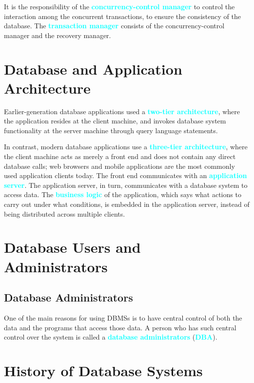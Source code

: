 \documentclass[a4paper,12pt,twoside,openany]{book}
\newcommand{\textcy}[1]{\textbf{\textcolor{cyan}{#1}}}
\begin{document}
It is the responsibility of the \textcy{concurrency-control manager} to control the interaction among the concurrent transactions, to ensure the consistency of the database. The \textcy{transaction manager} consists of the concurrency-control manager and the recovery manager.

\section{Database and Application Architecture}

Earlier-generation database applications used a \textcy{two-tier architecture}, where the application resides at the client machine, and invokes database system functionality at the server machine through query language statements.

In contrast, modern database applications use a \textcy{three-tier architecture}, where the client machine acts as merely a front end and does not contain any direct database calls; web browsers and mobile applications are the most commonly used application clients today. The front end communicates with an \textcy{application server}. The application server, in turn, communicates with a database system to access data. The \textcy{business logic} of the application, which says what actions to carry out under what conditions, is embedded in the application server, instead of being distributed across multiple clients.

\section{Database Users and Administrators}
\subsection{Database Administrators}

One of the main reasons for using DBMSs is to have central control of both the data and the programs that access those data. A person who has such central control over the system is called a \textcy{database administrators} (\textcy{DBA}).

\section{History of Database Systems}
\end{document}
